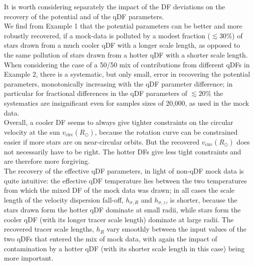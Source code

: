 It is worth considering separately the impact of the DF deviations on the recovery of the potential and of the qDF parameters. 
\\We find from Example 1 that the potential parameters can be better and more robustly recovered, if a mock-data \MAP{} is polluted by a modest fraction ($\lesssim 30\%$) of stars drawn from a much cooler qDF with a longer scale length, as opposed to the same pollution of stars drawn from a hotter qDF with a shorter scale length. 
\\When considering the case of a 50/50 mix of contributions from different qDFs in Example 2, there is a systematic, but only small, error in recovering the potential parameters, monotonically increasing with the qDF parameter difference; in particular for fractional differences in the qDF parameters of $\lesssim 20\%$ the systematics are insignificant even for samples sizes of 20,000, as used in the mock data. 
\\Overall, a cooler DF seems to always give tighter constraints on the circular velocity at the sun $v_\text{circ}(R_\odot)$, because the rotation curve can be constrained easier if more stars are on near-circular orbits. But the recovered $v_\text{circ}(R_\odot)$ does not necessarily have to be right. The hotter DFs give less tight constraints and are therefore more forgiving.
\\The recovery of the effective qDF parameters, in light of non-qDF mock data is quite intuitive: the effective qDF temperature lies between the two temperatures from which the mixed DF of the mock data was drawn; in all cases the scale length of the velocity dispersion fall-off, $h_{\sigma,R}$ and $h_{\sigma,z}$, is shorter, because the stars drawn form the hotter qDF dominate at small radii, while stars form the cooler qDF (with its longer tracer scale length) dominate at large radii. The recovered tracer scale lengths, $h_R$ vary smoothly between the input values of the two qDFs that entered the mix of mock data, with again the impact of contamination by a hotter qDF (with its shorter scale length in this case) being more important. 





